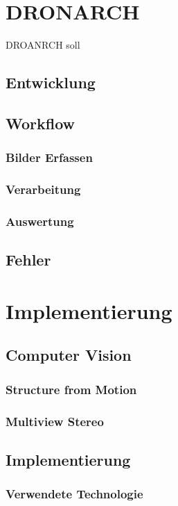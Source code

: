 \chapter{DRONARCH}
	DROANRCH soll
	\section{Entwicklung}
	
	\section{Workflow}
		\subsection{Bilder Erfassen}
		
		\subsection{Verarbeitung}
		
		\subsection{Auswertung}
		
	\section{Fehler}

\chapter{Implementierung}
	\section{Computer Vision}
		\subsection{Structure from Motion} \label{sfm}
		
		\subsection{Multiview Stereo} \label{mvs}
		
	\section{Implementierung}
		\subsection{Verwendete Technologie}